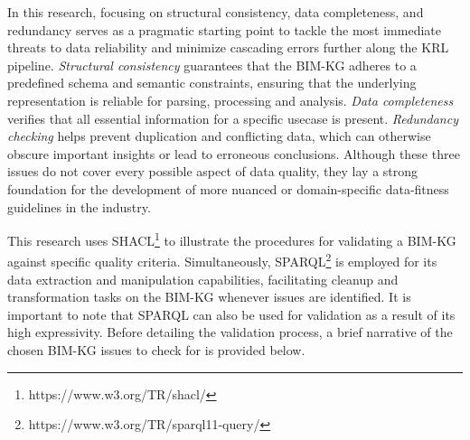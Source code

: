 In this research, focusing on structural consistency, data completeness, and redundancy serves as a pragmatic starting point to tackle the most immediate threats to data reliability and minimize cascading errors further along the KRL pipeline. \textit{Structural consistency} guarantees that the \ac{BIM-KG} adheres to a predefined schema and semantic constraints, ensuring that the underlying representation is reliable for parsing, processing and analysis. \textit{Data completeness} verifies that all essential information for a specific usecase is present. \textit{Redundancy checking} helps prevent duplication and conflicting data, which can otherwise obscure important insights or lead to erroneous conclusions. Although these three issues do not cover every possible aspect of data quality, they lay a strong foundation for the development of more nuanced or domain-specific data-fitness guidelines in the industry.

This research uses \ac{SHACL}\footnote{https://www.w3.org/TR/shacl/} to illustrate the procedures for validating a \ac{BIM-KG} against specific quality criteria. Simultaneously, \ac{SPARQL}\footnote{https://www.w3.org/TR/sparql11-query/} is employed for its data extraction and manipulation capabilities, facilitating cleanup and transformation tasks on the \ac{BIM-KG} whenever issues are identified. It is important to note that SPARQL can also be used for validation as a result of its high expressivity. Before detailing the validation process, a brief narrative of the chosen \ac{BIM-KG} issues to check for is provided below. 

